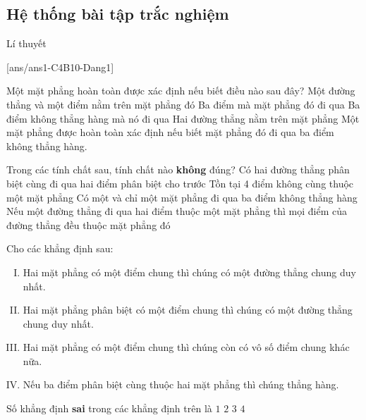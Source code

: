 \subsection{Hệ thống bài tập trắc nghiệm}
\setcounter{dang}{0}
\begin{dang}{Lí thuyết}
\end{dang}
[ans/ans1-C4B10-Dang1]
\begin{ex}%
Một mặt phẳng hoàn toàn được xác định nếu biết điều nào sau đây?
\choice
{Một đường thẳng và một điểm nằm trên mặt phẳng đó}
{Ba điểm mà mặt phẳng đó đi qua}
{\True Ba điểm không thẳng hàng mà nó đi qua}
{Hai đường thẳng nằm trên mặt phẳng}
\loigiai
{ 
Một mặt phẳng được hoàn toàn xác định nếu biết mặt phẳng đó đi qua ba điểm không thẳng hàng.
}
\end{ex}

\begin{ex}%
	Trong các tính chất sau, tính chất nào {\bf không} đúng?
	\choice
	{\True Có hai đường thẳng phân biệt cùng đi qua hai điểm phân biệt cho trước}
	{Tồn tại 4 điểm không cùng thuộc một mặt phẳng}
	{Có một và chỉ một mặt phẳng đi qua ba điểm không thẳng hàng}
	{Nếu một đường thẳng đi qua hai điểm thuộc một mặt phẳng thì mọi điểm của đường thẳng đều thuộc mặt phẳng đó}
\end{ex}

\begin{ex}%
	Cho các khẳng định sau:
	\begin{enumerate}[(I)]
		\item Hai mặt phẳng có một điểm chung thì chúng có một đường thẳng chung duy nhất.
		\item Hai mặt phẳng phân biệt có một điểm chung thì chúng có một đường thẳng chung duy nhất.
		\item Hai mặt phẳng có một điểm chung thì chúng còn có vô số điểm chung khác nữa.
		\item Nếu ba điểm phân biệt cùng thuộc hai mặt phẳng thì chúng thẳng hàng.
	\end{enumerate}
	Số khẳng định {\bf sai} trong các khẳng định trên là
	\choice
	{$1$}
	{\True $2$}
	{$3$}
	{$4$}
\end{ex}

